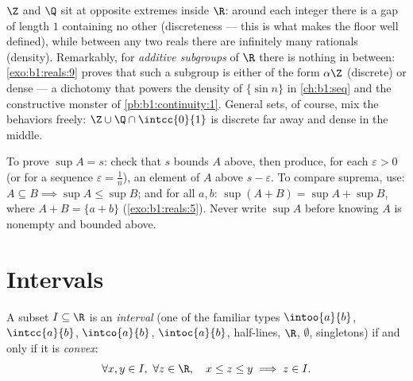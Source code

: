 \begin{remark}
$\Z$ and $\Q$ sit at opposite extremes inside $\R$: around each
integer there is a gap of length $1$ containing no other
(discreteness --- this is what makes the floor well defined),
while between any two reals there are infinitely many rationals
(density). Remarkably, for \emph{additive subgroups} of $\R$
there is nothing in between: \cref{exo:b1:reals:9} proves that
such a subgroup is either of the form $\alpha\Z$ (discrete) or
dense --- a dichotomy that powers the density of $\{\sin n\}$ in
\cref{ch:b1:seq} and the constructive monster of
\cref{pb:b1:continuity:1}. General sets, of course, mix the
behaviors freely: $\Z \cup \Q\cap\intcc{0}{1}$ is discrete far
away and dense in the middle.
\end{remark}

\begin{method}\label{met:b1:reals:supproofs}
To prove $\sup A = s$: check that $s$ bounds $A$ above, then produce,
for each $\varepsilon > 0$ (or for a sequence $\varepsilon = \frac
1n$), an element of $A$ above $s - \varepsilon$. To compare suprema,
use: $A \subseteq B \implies \sup A \leq \sup B$; and for all $a, b$:
$\sup(A + B) = \sup A + \sup B$, where $A + B = \{a + b\}$
(\cref{exo:b1:reals:5}). Never write $\sup A$ before knowing $A$ is
nonempty and bounded above.
\end{method}

\section{Intervals}

\begin{proposition}\label{prop:b1:reals:intervals}
A subset $I \subseteq \R$ is an \emph{interval} (one
of the familiar types $\intoo{a}{b}$, $\intcc{a}{b}$, $\intco{a}{b}$,
$\intoc{a}{b}$, half-lines, $\R$, $\emptyset$, singletons) if and
only if it is \emph{convex}:
\[
\forall x, y \in I,\ \forall z \in \R, \quad
x \leq z \leq y \implies z \in I .
\]
\end{proposition}

